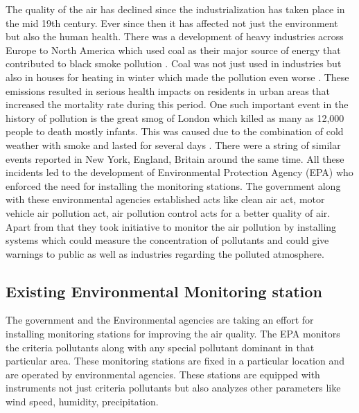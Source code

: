 The quality of the air has declined since the industrialization has taken place in the mid 19th century. Ever since then it has affected not just the environment but also the human health. There was a development of heavy industries across Europe to North America which used coal as their major source of energy that contributed to black smoke pollution \cite{Heidorn1978} \cite{Timothy}. Coal was not just used in industries but also in houses for heating in winter which made the pollution even worse \cite{Al2016}. These emissions resulted in serious health impacts on residents in urban areas that increased the mortality rate during this period. One such important event in the history of pollution is the great smog of London which killed as many as 12,000 people to death mostly infants. This was caused due to the combination of cold weather with smoke and lasted for several days \cite{londonfog}. There were a string of similar events reported in New York, England, Britain around the same time. All these incidents led to the development of Environmental Protection Agency (EPA) who enforced the need for installing the monitoring stations. The government along with these environmental agencies established acts like clean air act, motor vehicle air pollution act, air pollution control acts for a better quality of air\cite{airpollutionact}. Apart from that they took initiative to monitor the air pollution by installing systems which could measure the concentration of pollutants and could give warnings to public as well as industries regarding the  polluted atmosphere.


\subsection{Existing Environmental Monitoring station}

The government and the Environmental agencies are taking an effort for installing monitoring stations for improving the air quality. The EPA monitors the criteria pollutants along with any special pollutant dominant in that particular area. These monitoring stations are fixed in a particular location and are operated by environmental agencies. These stations are equipped with instruments not just criteria pollutants but also analyzes other parameters like wind speed, humidity, precipitation.
















